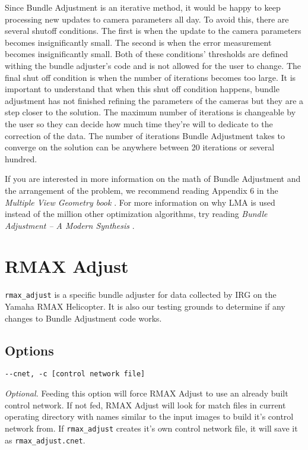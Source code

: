Since Bundle Adjustment is an iterative method, it would be happy to
keep processing new updates to camera parameters all day. To avoid
this, there are several shutoff conditions. The first is when the
update to the camera parameters becomes insignificantly small. The
second is when the error measurement becomes insignificantly
small. Both of these conditions' thresholds are defined withing the
bundle adjuster's code and is not allowed for the user to change. The
final shut off condition is when the number of iterations becomes too
large. It is important to understand that when this shut off condition
happens, bundle adjustment has not finished refining the parameters of
the cameras but they are a step closer to the solution. The maximum
number of iterations is changeable by the user so they can decide how
much time they're will to dedicate to the correction of the data. The
number of iterations Bundle Adjustment takes to converge on the
solution can be anywhere between 20 iterations or several hundred.

If you are interested in more information on the math of Bundle
Adjustment and the arrangement of the problem, we recommend reading
Appendix 6 in the {\em Multiple View Geometry book} \cite{hartley04}. 
For more information on why LMA is used instead of the million other 
optimization algorithms, try reading {\em Bundle Adjustment – A Modern 
Synthesis} \cite{triggs00}.

\section{RMAX Adjust}

\texttt{rmax\_adjust} is a specific bundle adjuster for data collected by IRG on
the Yamaha RMAX Helicopter. It is also our testing grounds to
determine if any changes to Bundle Adjustment code works.

\subsection{Options}

\begin{verbatim}
--cnet, -c [control network file]
\end{verbatim}

\emph{Optional.} Feeding this option will force RMAX Adjust to use an
already built control network. If not fed, RMAX Adjust will look for
match files in current operating directory with names similar to the
input images to build it's control network from. If \texttt{rmax\_adjust}
creates it's own control network file, it will save it as
\verb=rmax_adjust.cnet=.

